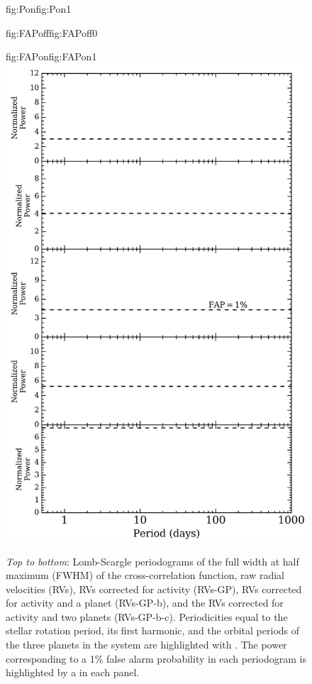 \begin{figure}
\begin{ocg}{fig:Pon}{fig:Pon}{1}
  \end{ocg}
  \hspace{-0.8\hsize}%
  \begin{ocg}{fig:FAPoff}{fig:FAPoff}{0}%
  \end{ocg}%
  \begin{ocg}{fig:FAPon}{fig:FAPon}{1}%
    \includegraphics[width=0.8\hsize]{figures/periodograms_FAP.png}%
  \end{ocg}
  \hspace{-0.8\hsize}%
  \caption[Illustrating the iterative planet search with Lomb-Scargle periodograms.]
      {\small \emph{Top to bottom}: Lomb-Scargle periodograms of the full width at half maximum (FWHM)
    of the cross-correlation function, raw radial velocities (RVs), RVs corrected for activity (RVs-GP),
    RVs corrected for activity and a planet (RVs-GP-b), and the RVs corrected for activity and two planets
    (RVs-GP-b-c). Periodicities equal to the stellar rotation period, its first harmonic, and the
    orbital periods of the three planets in the system are highlighted with
    . The power
    corresponding to a 1\% false alarm probability in each periodogram is highlighted by a  
     in each panel.}
  \label{BSfig:periodograms}
\end{figure}


